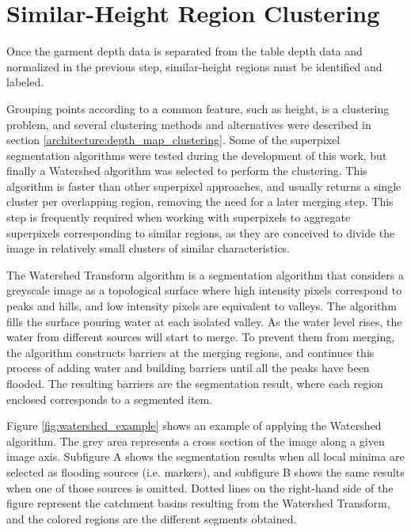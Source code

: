\section{Similar-Height Region Clustering}
\label{garment_clustering_watershed}

Once the garment depth data is separated from the table depth data and normalized in the previous step, similar-height regions must be identified and labeled.

Grouping points according to a common feature, such as height, is a clustering problem, and several clustering methods and alternatives were described in section \ref{architecture:depth_map_clustering}. Some of the superpixel segmentation algorithms were tested during the development of this work, but finally a Watershed \cite{digabel1978iterative} algorithm was selected to perform the clustering. This algorithm is faster than other superpixel approaches, and usually returns a single cluster per overlapping region, removing the need for a later merging step. This step is frequently required when working with superpixels to aggregate superpixels corresponding to similar regions, as they are conceived to divide the image in relatively small clusters of similar characteristics.

The Watershed Transform algorithm is a segmentation algorithm that considers a greyscale image as a topological surface where high intensity pixels correspond to peaks and hills, and low intensity pixels are equivalent to valleys. The algorithm fills the surface pouring water at each isolated valley. As the water level rises, the water from different sources will start to merge. To prevent them from merging, the algorithm constructs barriers at the merging regions, and continues this process of adding water and building barriers until all the peaks have been flooded. The resulting barriers are the segmentation result, where each region enclosed corresponds to a segmented item. 

Figure \ref{fig:watershed_example} shows an example of applying the Watershed algorithm. The grey area represents a cross section of the image along a given image axis. Subfigure A shows the segmentation results when all local minima are selected as flooding sources (i.e. markers), and subfigure B shows the same results when one of those sources is omitted. Dotted lines on the right-hand side of the figure represent the catchment basins resulting from the Watershed Transform, and the colored regions are the different segments obtained.

